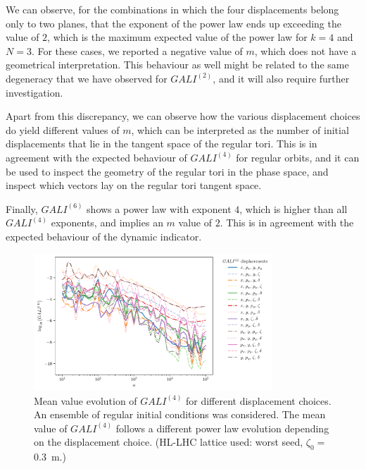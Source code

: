We can observe, for the combinations in which the four displacements belong only to two planes, that the exponent of the power law ends up exceeding the value of $2$, which is the maximum expected value of the power law for $k=4$ and $N=3$. For these cases, we reported a negative value of $m$, which does not have a geometrical interpretation. This behaviour as well might be related to the same degeneracy that we have observed for $GALI^{(2)}$, and it will also require further investigation.

Apart from this discrepancy, we can observe how the various displacement choices do yield different values of $m$, which can be interpreted as the number of initial displacements that lie in the tangent space of the regular tori. This is in agreement with the expected behaviour of $GALI^{(4)}$ for regular orbits, and it can be used to inspect the geometry of the regular tori in the phase space, and inspect which vectors lay on the regular tori tangent space.

Finally, $GALI^{(6)}$ shows a power law with exponent $4$, which is higher than all $GALI^{(4)}$ exponents, and implies an $m$ value of $2$. This is in agreement with the expected behaviour of the dynamic indicator.

\begin{figure}
    \centering
    \includegraphics[width=0.8\textwidth]{6_lhc_dynamic_indicators/figs/evolution_gali_4_stable.pdf}
    \caption{Mean value evolution of $GALI^{(4)}$ for different displacement choices. An ensemble of regular initial conditions was considered. The mean value of $GALI^{(4)}$ follows a different power law evolution depending on the displacement choice. (HL-LHC lattice used: worst seed, $\zeta_0=$\SI{0.3}{\meter}.)}
    \label{fig:gali4}
\end{figure}

